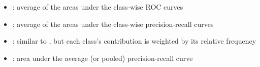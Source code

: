 \begin{itemize}
\begin{itemize}
                	\begin{itemize}
                    \item {}: average of the areas under the class-wise ROC curves
                    \item {}: average of the areas under the class-wise precision-recall curves
                    \item {}: similar to , but each class's contribution is weighted by its relative frequency
                    \item {}: area under the average (or pooled) precision-recall curve
                \end{itemize}
           \end{itemize}
\end{itemize}
